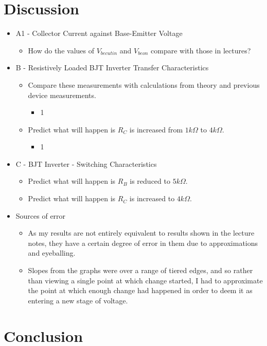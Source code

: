 \documentclass[12pt]{article}
\begin{document}
\section{Discussion}
\begin{itemize}
\item A1 - Collector Current against Base-Emitter Voltage
\begin{itemize}
\item How do the values of $V_{be cut in}$ and $V_{be on}$ compare with those in lectures?
\end{itemize}
\item B - Resistively Loaded BJT Inverter Transfer Characteristics
\begin{itemize}
\item Compare these measurements with calculations from theory and previous device measurements.
\begin{itemize}
\item 1
\end{itemize}
\item Predict what will happen is $R_C$ is increased from $1k\Omega$ to $4k\Omega$.
\begin{itemize}
\item 1
\end{itemize}
\end{itemize}
\item C - BJT Inverter - Switching Characteristics
\begin{itemize}
\item Predict what will happen is $R_B$ is reduced to $5k\Omega$.
\item Predict what will happen is $R_C$ is increased to $4k\Omega$.
\end{itemize}
\item Sources of error
\begin{itemize}
\item As my results are not entirely equivalent to results shown in the lecture notes, they have a certain degree of error in them due to approximations and eyeballing.
\item Slopes from the graphs were over a range of tiered edges, and so rather than viewing a single point at which change started, I had to approximate the point at which enough change had happened in order to deem it as entering a new stage of voltage.
\end{itemize}
\end{itemize}
\section{Conclusion}
\end{document}

